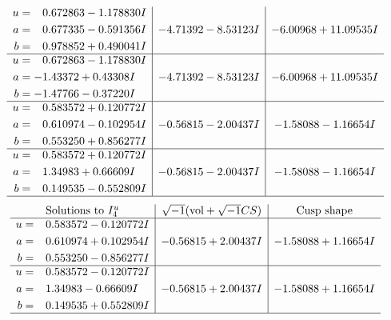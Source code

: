 \documentclass[1p]{elsarticle_modified}
\theoremstyle{definition}
\newcommand{\I}{\sqrt{-1}}
\begin{document}
$$\begin{array}{c|c|c}
\begin{aligned}
u &= \phantom{-}0.672863 - 1.178830 I \\
a &= \phantom{-}0.677335 - 0.591356 I \\
b &= \phantom{-}0.978852 + 0.490041 I\end{aligned}
 & -4.71392 - 8.53123 I & -6.00968 + 11.09535 I \\ \hline\begin{aligned}
u &= \phantom{-}0.672863 - 1.178830 I \\
a &= -1.43372 + 0.43308 I \\
b &= -1.47766 - 0.37220 I\end{aligned}
 & -4.71392 - 8.53123 I & -6.00968 + 11.09535 I \\ \hline\begin{aligned}
u &= \phantom{-}0.583572 + 0.120772 I \\
a &= \phantom{-}0.610974 - 0.102954 I \\
b &= \phantom{-}0.553250 + 0.856277 I\end{aligned}
 & -0.56815 - 2.00437 I & -1.58088 - 1.16654 I \\ \hline\begin{aligned}
u &= \phantom{-}0.583572 + 0.120772 I \\
a &= \phantom{-}1.34983 + 0.66609 I \\
b &= \phantom{-}0.149535 - 0.552809 I\end{aligned}
 & -0.56815 - 2.00437 I & -1.58088 - 1.16654 I\\
 \hline 
 \end{array}$$\newpage$$\begin{array}{c|c|c}  
\text{Solutions to }I^u_{4}& \I (\text{vol} + \sqrt{-1}CS) & \text{Cusp shape}\\
 \hline 
\begin{aligned}
u &= \phantom{-}0.583572 - 0.120772 I \\
a &= \phantom{-}0.610974 + 0.102954 I \\
b &= \phantom{-}0.553250 - 0.856277 I\end{aligned}
 & -0.56815 + 2.00437 I & -1.58088 + 1.16654 I \\ \hline\begin{aligned}
u &= \phantom{-}0.583572 - 0.120772 I \\
a &= \phantom{-}1.34983 - 0.66609 I \\
b &= \phantom{-}0.149535 + 0.552809 I\end{aligned}
 & -0.56815 + 2.00437 I & -1.58088 + 1.16654 I\\
 \hline 
 \end{array}$$\newpage
\end{document}
